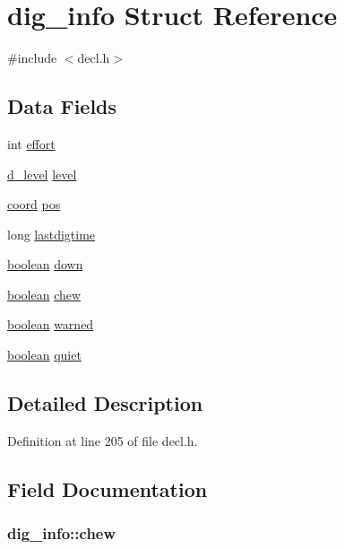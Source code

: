\hypertarget{structdig__info}{\section{dig\+\_\+info Struct Reference}
\label{structdig__info}
}


{\ttfamily \#include $<$decl.\+h$>$}

\subsection*{Data Fields}
\begin{DoxyCompactItemize}
\item 
int \hyperlink{structdig__info_acfc6cff51c35b0611d8e97b6b86a9b8e}{effort}
\item 
\hyperlink{structd__level}{d\+\_\+level} \hyperlink{structdig__info_afa100a1c1a0841e1f3b8a689712debf5}{level}
\item 
\hyperlink{structcoord}{coord} \hyperlink{structdig__info_ae05795787c5d19119fca2d09ce2788eb}{pos}
\item 
long \hyperlink{structdig__info_a554dcfbb823177376ac92358c15a7fd2}{lastdigtime}
\item 
\hyperlink{global_8h_a531b10dd351aa162d7dcccd1966308b8}{boolean} \hyperlink{structdig__info_aa0a1830de7549e20d2ddbfca3368d143}{down}
\item 
\hyperlink{global_8h_a531b10dd351aa162d7dcccd1966308b8}{boolean} \hyperlink{structdig__info_abe58c9d9cf953d8af9db0872a3d859df}{chew}
\item 
\hyperlink{global_8h_a531b10dd351aa162d7dcccd1966308b8}{boolean} \hyperlink{structdig__info_a948c106179b81443e03efab29dabc0d9}{warned}
\item 
\hyperlink{global_8h_a531b10dd351aa162d7dcccd1966308b8}{boolean} \hyperlink{structdig__info_af3e6957d329c4568059d05c272364020}{quiet}
\end{DoxyCompactItemize}


\subsection{Detailed Description}


Definition at line 205 of file decl.\+h.



\subsection{Field Documentation}
\hypertarget{structdig__info_abe58c9d9cf953d8af9db0872a3d859df}{
\subsubsection[{chew}]{ dig\+\_\+info\+::chew}}\label{structdig__info_abe58c9d9cf953d8af9db0872a3d859df}


